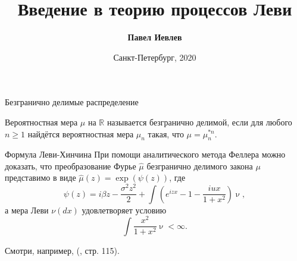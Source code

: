 \documentclass[8pt]{beamer}
\begin{document}
\title[Процессы Леви]{Введение в теорию процессов Леви}
\author[Павел Иевлев]{\textbf{Павел Иевлев}}

\date{Санкт-Петербург, 2020}

\frame[plain]{\titlepage}

\begin{frame}{Безгранично делимые распределение}
  \begin{definition}
    Вероятностная мера \( \mu \) на \( \mathbb{R} \)
    называется безгранично делимой, если для любого \( n \geq
      1
    \) найдётся вероятностная мера \( \mu_n \) такая, что \(
    \mu = \mu_n^{*n} \).
  \end{definition}



\end{frame}

\begin{frame}{Формула Леви-Хинчина}
  При помощи аналитического метода Феллера можно доказать, что
  преобразование Фурье \( \widehat{\mu} \) безгранично
  делимого закона \( \mu \) представимо в виде \(
  \widehat{\mu} ( z ) = \exp ( \psi(z) ) \), где
  \[
    \psi ( z ) = i \beta z
    - \frac{\sigma^2 z^2}{2}
    + \int \left(
      e^{i z x} - 1 - \frac{i u x}{1 + x^2}
    \right)
    \mathop{\nu (d x)},
  \]
  а мера Леви \( \nu ( dx ) \) удовлетворяет условию
  \[
    \int \frac{x^2}{1 + x^2} \mathop{\nu ( dx )}
    < \infty.
  \]

  Смотри, например, (\cite{revuzyor}, стр. 115).
\end{frame}
\end{document}
